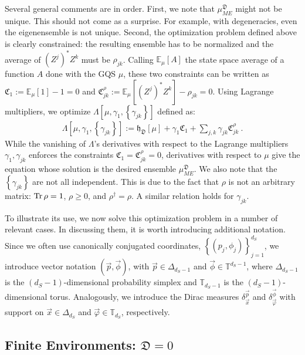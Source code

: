 \documentclass[draft,nofootinbib,pre,twocolumn,showpacs,showkeys,groupaddress,preprintnumbers,floatfix]{revtex4-1}
\newcommand{\1}{\mathbbm{1}}
\newcommand{\ID}{\mathfrak{D}}
\newcommand{\GE}{\mathfrak{h}_{\ID}}
\begin{document}
Several general comments are in order. First, we note that $\mu_{ME}^{\ID}$
might not be unique. This should not come as a surprise. For example, with
degeneracies, even the eigenensemble is not unique. Second, the optimization
problem defined above is clearly constrained: the resulting ensemble has to be
normalized and the average of ${(Z^{j})}^{*}Z^{k}$ must be $\rho_{jk}$. Calling
$\mathbb{E}_\mu[A]$ the state space average of a function $A$ done with the 
GQS $\mu$, these two constraints can be written as $\mathfrak{C}_{1} := \mathbb{E}_{\mu}[1] - 1 = 0$
and $\mathfrak{C}^{\rho}_{jk}:=\mathbb{E}_{\mu}[{(Z^{j})}^{*}Z^{k}] - \rho_{jk} = 0$.
Using Lagrange multipliers, we optimize
$\Lambda[\mu,\gamma_1,\left\{\gamma_{jk} \right\}]$ defined as:
\begin{align*}
\Lambda[\mu,\gamma_1,\left\{\gamma_{jk} \right\}]:=\GE\left[\mu\right] + \gamma_1 \mathfrak{C}_1 + \sum_{j,k}\gamma_{jk}\mathfrak{C}^{\rho}_{jk} 
  ~.
\end{align*}
While the vanishing of $\Lambda$'s derivatives with respect to the Lagrange
multipliers $\gamma_1,\gamma_{jk}$ enforces the constraints
$\mathfrak{C}_{1}=\mathfrak{C}_{jk}^{\rho}=0$, derivatives with respect to
$\mu$ give the equation whose solution is the desired ensemble $\mu_{ME}^{\ID}$.
We also note that the $\left\{ \gamma_{jk}\right\}$ are not all independent.
This is due to the fact that $\rho$ is not an arbitrary matrix: $\Tr \rho = 1$,
$\rho \geq 0$, and $\rho^{\dagger}=\rho$. A similar relation holds for $\gamma_{jk}$.

To illustrate its use, we now solve this optimization problem in a number of
relevant cases. In discussing them, it is worth introducing additional
notation. Since we often use canonically conjugated coordinates, $\left\{
(p_j,\phi_j)\right\}_{j=1}^{d_S}$, we introduce vector notation
$(\vec{p},\vec{\phi})$, with $\vec{p} \in \Delta_{d_S-1}$ and $\vec{\phi} \in
\mathbb{T}^{d_S-1}$, where $\Delta_{d_S-1}$ is the $(d_S-1)$-dimensional probability
simplex and $\mathbb{T}_{d_S-1}$ is the $(d_S-1)$-dimensional torus. Analogously, we
introduce the Dirac measures $\delta^{\vec{p}}_{\vec{x}}$ and
$\delta^{\vec{\phi}}_{\vec{\varphi}}$ with support on $\vec{x} \in
\Delta_{d_S}$ and $\vec{\varphi} \in \mathbb{T}_{d_S}$, respectively.

\subsection*{Finite Environments: $\ID = 0$}
\end{document}

